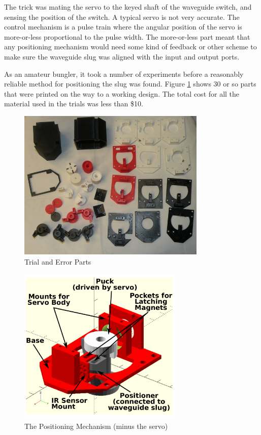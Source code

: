 \documentclass[12pt]{article}
\begin{document}
The trick was mating the servo to the keyed shaft of the waveguide switch,
and sensing the position of the switch.  A typical servo is not very
accurate. The control mechanism is a pulse train where the angular position
of the servo is more-or-less proportional to the pulse width.  The more-or-less
part meant that any positioning mechanism would need some kind of feedback
or other scheme to make sure the waveguide slug was aligned with the input
and output ports.

As an amateur bungler, it took a number of experiments before a
reasonably reliable method for positioning the slug was found. Figure
\ref{f_trial_and_error} shows 30 or so parts that were printed on the
way to a working design.  The total cost for all the material used in
the trials was less than \$10.

\begin{figure}[tb]
  \centering
  \includegraphics[width=0.8\textwidth]{TrialAndError1.jpg}
  \caption{\label{f_trial_and_error}Trial and Error Parts}
\end{figure}

\begin{figure}[thb]
\centering
    \includegraphics[width=0.7\textwidth]{AssemblyView.pdf}
    \caption{\label{f_expview}The Positioning Mechanism (minus the servo)}  
\end{figure}
\end{document}

